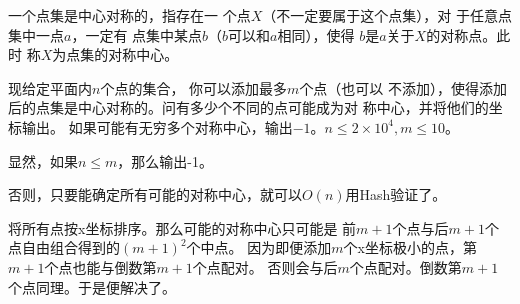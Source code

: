 \begin{prob}
	一个点集是中心对称的，指存在一
	个点$X$（不一定要属于这个点集），对
	于任意点集中一点$a$，一定有
	点集中某点$b$（$b$可以和$a$相同），使得
	$b$是$a$关于$X$的对称点。此时
	称$X$为点集的对称中心。\par 现给定平面内$n$个点的集合，
	你可以添加最多$m$个点（也可以
	不添加），使得添加后的点集是中心对称的。问有多少个不同的点可能成为对
	称中心，并将他们的坐标输出。
	如果可能有无穷多个对称中心，输出$-1$。$n \le 2 \times 10^4, m \le 10$。
\end{prob}

\begin{sol}
	显然，如果$n \le m$，那么输出-1。\par
	否则，只要能确定所有可能的对称中心，就可以$O(n)$用Hash验证了。
	\par 将所有点按x坐标排序。那么可能的对称中心只可能是
	前$m+1$个点与后$m+1$个点自由组合得到的$(m+1)^2$个中点。
	因为即便添加$m$个x坐标极小的点，第$m+1$个点也能与倒数第$m+1$个点配对。
	否则会与后$m$个点配对。倒数第$m+1$个点同理。于是便解决了。
\end{sol}
